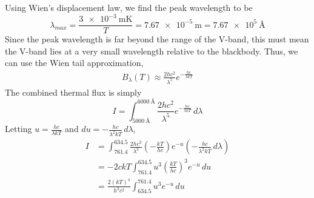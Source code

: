 \documentclass{article}
\begin{document}
Using Wien's displacement law, we find the peak wavelength to be
\begin{equation}
    \lambda_{max} = \frac{\SI{3e-3}{\meter\kelvin}}{T} = \SI{7.67e-5}{\meter} = \SI{7.67e+5}{\angstrom}
\end{equation}
Since the peak wavelength is far beyond the range of the V-band, this must mean the V-band lies at a very small wavelength relative to the blackbody.
Thus, we can use the Wien tail approximation,
\begin{eqnarray}
    B_\lambda(T) \approx \frac{2hc^2}{\lambda^5} e^{-\frac{hc}{\lambda k T}}
\end{eqnarray}
The combined thermal flux is simply
\begin{equation}
    I = \int_{\SI{5000}{\angstrom}}^{\SI{6000}{\angstrom}} \frac{2hc^2}{\lambda^5} e^{-\frac{hc}{\lambda k T}} \, d\lambda
\end{equation}
Letting \(u = \frac{hc}{\lambda k T}\) and \(du = -\frac{hc}{\lambda^2 k T} \, d\lambda\),
\begin{align}
    I &= \int_{\num{761.4}}^{\num{634.5}} \frac{2hc^2}{\lambda^3} \left(-\frac{k T}{h c}\right)e^{-u} \left(-\frac{hc}{\lambda^2 k T} \, d\lambda\right) \\
    &= -2ckT \int_{\num{761.4}}^{\num{634.5}} u^3 \left(\frac{kT}{hc}\right)^3 e^{-u} \, du \\
    &= \frac{2(kT)^4}{h^3c^2} \int_{\num{634.5}}^{\num{761.4}} u^3 e^{-u} \, du
\end{align}
\end{document}
